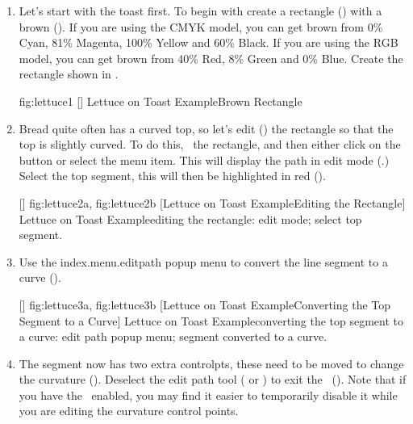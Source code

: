 \begin{enumerate}
\item Let's start with the toast first. To begin with create
a rectangle () with a brown
 (). If you are using
the CMYK model, you can get brown from 0\% Cyan, 81\% Magenta,
100\% Yellow and 60\% Black. If you are using the RGB model,
you can get brown from 40\% Red, 8\% Green and 0\% Blue. Create the
rectangle shown in .

\FloatFig
{fig:lettuce1}
[]
{}
{Lettuce on Toast Example\dash Brown Rectangle}

\item Bread quite often has a curved top, so let's
edit () the rectangle
so that the top is slightly curved. To do this,
\select\ the rectangle, and
then either click on the  button or select the
 menu item. This will display
the \gls{path} in edit mode (.)
Select the top segment, this will then be highlighted in red
().

[]
{
 {fig:lettuce2a}{}{},
 {fig:lettuce2b}{}{}
}
[Lettuce on Toast Example\dash Editing the Rectangle]
{Lettuce on Toast Example\dash editing the rectangle:
 edit mode;
 select top segment.}

\item Use the \gls{index.menu.editpath} popup menu to convert the line segment to a
curve ().

[]
{
  {fig:lettuce3a}{}{},
  {fig:lettuce3b}{}{}
}
[Lettuce on Toast Example\dash Converting the Top Segment to a Curve]
{Lettuce on Toast Example\dash converting the top segment to
a curve:
 edit path popup menu;
 segment converted to a curve.}

\item The segment now has two extra
\glspl{controlpt}, these need to be moved
to change the curvature (). Deselect
the edit path tool ( or
) to exit
the \editpathmode\ (). Note that if
you have the \gridlock\ enabled, you may find it easier to
temporarily disable it while you are editing the curvature control
points.


\end{enumerate}
